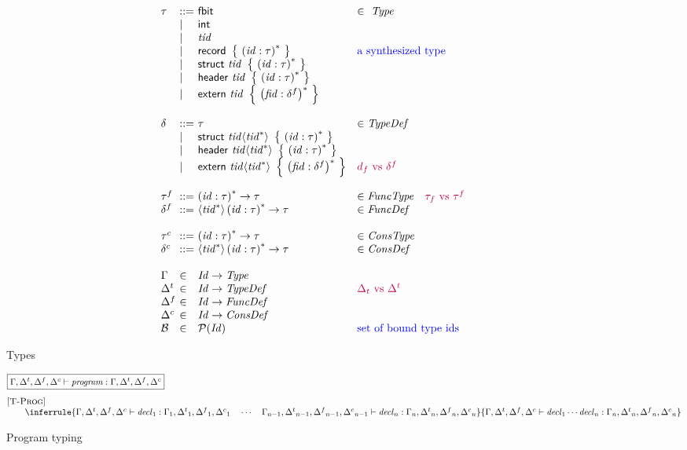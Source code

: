 \documentclass{article}
\newcommand{\inblue}{\color{blue}}
\newcommand{\ryu}{\color{purple}}
\newcommand{\embox}[1]{\mbox{\emph{#1}}}
\newcommand{\prths}[1]{\left(#1\right)}
\newcommand{\braces}[1]{\left\{\ #1\ \right\}}
\newcommand{\nprog}{\embox{program}}
\newcommand{\ndecl}{\embox{decl}}
\newcommand{\ntid}{\embox{tid}}
\newcommand{\nid}{\embox{id}}
\newcommand{\nId}{\embox{Id}}
\newcommand{\nType}{\embox{Type}}
\newcommand{\nTypeDef}{\embox{TypeDef}}
\newcommand{\nFuncType}{\embox{FuncType}}
\newcommand{\nFuncDef}{\embox{FuncDef}}
\newcommand{\nConsType}{\embox{ConsType}}
\newcommand{\nConsDef}{\embox{ConsDef}}
\newcommand{\nfid}{\embox{fid}}
\newcommand{\tstruct}{\mathsf{struct}}
\newcommand{\theader}{\mathsf{header}}
\newcommand{\textern}{\mathsf{extern}}
\newcommand{\tfbit}{\mathsf{fbit}}
\newcommand{\tint}{\mathsf{int}}
\newcommand{\trecord}{\mathsf{record}}
\newcommand{\topena}{\langle}
\newcommand{\tclosea}{\rangle}
\newcommand{\tyd}{\delta}
\newcommand{\fnd}{\delta^f}
\newcommand{\cnd}{\delta^c}
\newcommand{\tyenvt}{{\Delta^t}}
\newcommand{\tyenvf}{{\Delta^f}}
\newcommand{\tyenvc}{{\Delta^c}}
\newcommand{\dect}[9]{#1, #2, #3, #4 \vdash #5 : #6, #7, #8, #9}
\newcommand{\decty}[5]{\dect{\Gamma}{\tyenvt}{\tyenvf}{\tyenvc}{#1}{#2}{#3}{#4}{#5}}
\begin{document}
\begin{figure}[t]
\[
\begin{array}{l@{~}l@{~}ll}
\tau & ::= & \tfbit & \in\ \nType\\
& \mid & \tint\\
& \mid & \ntid\\
& \mid & \trecord\ \braces{\prths{\nid: \tau}^*} & \mbox{\inblue a synthesized type}\\ 
& \mid & \tstruct\ \ntid\ \braces{\prths{\nid: \tau}^*} \\
& \mid & \theader\ \ntid\ \braces{\prths{\nid: \tau}^*} \\
& \mid & \textern\ \ntid\ \braces{\prths{\nfid: \fnd}^*} \\ \\
\tyd & ::= & \tau & \in \nTypeDef\\
& \mid & \tstruct\ \ntid \topena \ntid^* \tclosea\ \braces{\prths{\nid : \tau}^*}\\
& \mid & \theader\ \ntid \topena \ntid^* \tclosea\ \braces{\prths{\nid : \tau}^*}\\
& \mid & \textern\ \ntid \topena \ntid^* \tclosea\ \braces{\prths{\nfid: \fnd}^*}
& \mbox{\ryu $d_f$ vs $\delta^f$}\\ \\
\tau^f & ::= & \prths{\nid: \tau}^* \rightarrow \tau & \in \nFuncType
\quad \mbox{\ryu $\tau_f$ vs $\tau^f$}\\
\fnd & ::= & \topena \ntid^* \tclosea \prths{\nid: \tau}^* \rightarrow \tau & \in \nFuncDef\\ \\
\tau^c & ::= & \prths{\nid: \tau}^* \rightarrow \tau & \in \nConsType\\
\cnd & ::= & \topena \ntid^* \tclosea \prths{\nid: \tau}^* \rightarrow \tau & \in \nConsDef\\ \\
\Gamma & \in & \nId \rightarrow \nType\\
\tyenvt & \in & \nId \rightarrow \nTypeDef & \mbox{\ryu $\Delta_t$ vs $\Delta^t$}\\
\tyenvf & \in & \nId \rightarrow \nFuncDef\\
\tyenvc & \in & \nId \rightarrow \nConsDef\\
\mathcal{B} & \in & \mathcal{P}(\nId) & \mbox{\inblue set of bound type ids}
\end{array}
\]
\caption{Types}
\label{fig:types}
\end{figure}

\begin{figure}[t]
\[
\begin{array}{@{}l@{}}
\fbox{$\decty{\nprog}{\Gamma}{\tyenvt}{\tyenvf}{\tyenvc}$}\\[1em]
[\textsc{T-Prog}]\\\qquad
\inferrule
{\decty{\ndecl_1}{\Gamma_1}{\tyenvt_1}{\tyenvf_1}{\tyenvc_1}\quad\cdots\quad
\dect {\Gamma_{n-1}}{\tyenvt_{n-1}}{\tyenvf_{n-1}}{\tyenvc_{n-1}}
{\ndecl_n}{\Gamma_n}{\tyenvt_n}{\tyenvf_n}{\tyenvc_n}
}
{ \decty{\ndecl_1\cdots\ndecl_n}
   {\Gamma_n}{\tyenvt_n}{\tyenvf_n}{\tyenvc_n} }
\end{array}
\]
\caption{Program typing}
\label{fig:prog-typ}
\end{figure}
\end{document}
